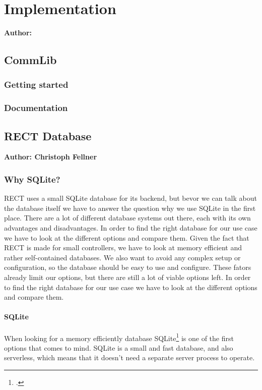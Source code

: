 \chapter{Implementation}

\textbf{Author: } 

\section{CommLib}
\subsection{Getting started}



\subsection{Documentation}

\section{RECT Database}
\textbf{Author: Christoph Fellner}

\subsection{Why SQLite?}
RECT uses a small SQLite database for its backend, but bevor we can talk about the database itself we have to answer the question why we use SQLite in the first place. 
There are a lot of different database systems out there, each with its own advantages and disadvantages. In order to find the right database for our use case we have to 
look at the different options and compare them. Given the fact that RECT is made for small controllers, we have to look at memory efficient and rather self-contained 
databases. We also want to avoid any complex setup or configuration, so the database should be easy to use and configure. These fators already limit our options, but there 
are still a lot of viable options left. In order to find the right database for our use case we have to look at the different options and compare them. 

\subsubsection{SQLite}
When looking for a memory efficiently database SQLite\footcite{sqlite} is one of the first options that comes to mind. SQLite is a small and fast database, and also serverless, 
which means that it doesn't need a separate server process to operate. 


